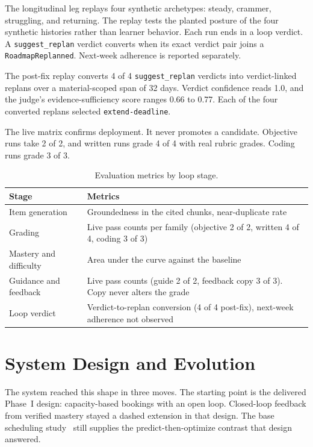 The longitudinal leg replays four synthetic archetypes: steady, crammer, struggling, and returning. The replay tests the planted posture of the four synthetic histories rather than learner behavior. Each run ends in a loop verdict. A \texttt{suggest\_replan} verdict converts when its exact verdict pair joins a \texttt{RoadmapReplanned}. Next-week adherence is reported separately.

The post-fix replay converts 4 of 4 \texttt{suggest\_replan} verdicts into verdict-linked replans over a material-scoped span of 32 days. Verdict confidence reads 1.0, and the judge's evidence-sufficiency score ranges 0.66 to 0.77. Each of the four converted replans selected \texttt{extend-deadline}.

The live matrix confirms deployment. It never promotes a candidate. Objective runs take 2 of 2, and written runs grade 4 of 4 with real rubric grades. Coding runs grade 3 of 3.

\begin{table}[htbp]
\centering
\footnotesize
\caption{Evaluation metrics by loop stage.}
\label{tab:phase2-metrics}
\begin{tabular}{p{3.0cm} p{9.0cm}}
\toprule
\textbf{Stage} & \textbf{Metrics} \\
\midrule
Item generation & Groundedness in the cited chunks, near-duplicate rate \\
Grading & Live pass counts per family (objective 2 of 2, written 4 of 4, coding 3 of 3) \\
Mastery and difficulty & Area under the curve against the baseline \\
 Guidance and feedback & Live pass counts (guide 2 of 2, feedback copy 3 of 3). Copy never alters the grade \\
 Loop verdict & Verdict-to-replan conversion (4 of 4 post-fix), next-week adherence not observed \\
\bottomrule
\end{tabular}
\end{table}

\section{System Design and Evolution}
The system reached this shape in three moves. The starting point is the delivered Phase~I design: capacity-based bookings with an open loop. Closed-loop feedback from verified mastery stayed a dashed extension in that design. The base scheduling study~\cite{islam2024} still supplies the predict-then-optimize contrast that design answered.

